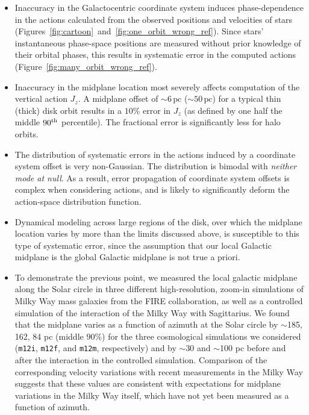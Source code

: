 \documentclass[twocolumn]{aastex62}
\newcommand{\pc}{\text{pc}}
\newcommand{\mi}{\texttt{m12i}}
\newcommand{\mf}{\texttt{m12f}}
\newcommand{\mm}{\texttt{m12m}}
\newcommand{\uth}{\textsuperscript{th}}
\begin{document}
\begin{itemize}
\item Inaccuracy in the Galactocentric coordinate
system induces phase-dependence in the actions calculated from the observed
positions and velocities of stars
(Figures~\ref{fig:cartoon}~and~\ref{fig:one_orbit_wrong_ref}). Since stars'
instantaneous phase-space positions are measured without prior knowledge of
their orbital phases, this results in systematic error in the computed actions
(Figure~\ref{fig:many_orbit_wrong_ref}).

\item Inaccuracy in the midplane location most severely affects computation of
the vertical action $J_z$.  A midplane offset of $\sim6\,\pc$ ($\sim50\,\pc$)
for a typical thin (thick) disk orbit results in a  $10\%$ error in $J_z$ (as
defined by one half the middle $90\uth$ percentile). The fractional error is
significantly less for halo orbits.

\item The distribution of systematic errors in the actions induced by a
coordinate system offset is very non-Gaussian. The distribution is bimodal
with \emph{neither mode at null}. As a result, error propagation of coordinate
system offsets is complex when considering actions, and is likely to
significantly deform the action-space distribution function.

\item Dynamical modeling across large regions of the disk, over which the
midplane location varies by more than the limits discussed above, is
susceptible to this type of systematic error, since the assumption that our
local Galactic midplane is the global Galactic midplane is not true a
priori.

\item To demonstrate the previous point, we measured the local galactic
midplane along the Solar circle in three different high-resolution, zoom-in
simulations of Milky Way mass galaxies from the FIRE collaboration, as well as a controlled simulation of the interaction of the Milky Way with Sagittarius. We found
that the midplane varies as a function of azimuth at the Solar circle by
$\sim$185, 162, 84 pc (middle $90\%$) for the three cosmological simulations we considered
(\mi{}, \mf{}, and \mm{}, respectively) and by $\sim$30 and $\sim$100 pc before and after the interaction in the controlled simulation. Comparison of the corresponding velocity variations with recent measurements in the Milky Way suggests that these values are consistent with expectations for midplane variations in the Milky Way itself, which have not yet been measured as a function of azimuth.


\end{itemize}
\end{document}
